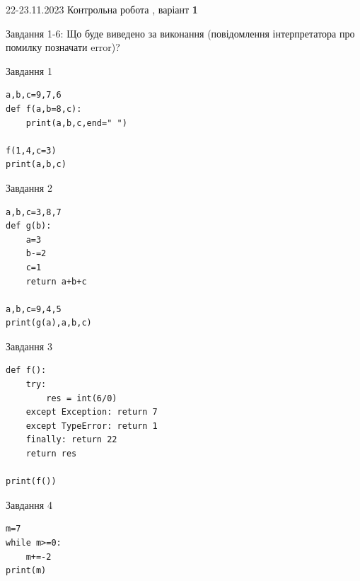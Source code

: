 \documentclass[12pt, ukrainian]{article}
\begin{document}
{{22-23.11.2023 Контрольна робота , варіант  \No \textbf { 1 }\par}}
{

Завдання 1-6: Що буде виведено за виконання (повідомлення інтерпретатора про помилку позначати error)?


\begin{minipage}[t]{9.7cm}                
{\begin{center}Завдання {1}\end{center}}
\begin{verbatim}
a,b,c=9,7,6
def f(a,b=8,c):
    print(a,b,c,end=" ")

f(1,4,c=3)
print(a,b,c)
\end{verbatim}     
\end{minipage}
\vline \hspace{8mm}
\begin{minipage}[t]{8.0cm}                
{\begin{center}Завдання {2}\end{center}}
\begin{verbatim}
a,b,c=3,8,7
def g(b):
    a=3
    b-=2
    c=1
    return a+b+c

a,b,c=9,4,5
print(g(a),a,b,c)
\end{verbatim}     
\end{minipage}

\vspace{15mm}
\begin{minipage}[t]{9.7cm}                
{\begin{center}Завдання {3}\end{center}}
\begin{verbatim}
def f():
    try:
        res = int(6/0)
    except Exception: return 7
    except TypeError: return 1
    finally: return 22
    return res

print(f())
\end{verbatim}     
\end{minipage}
\vline \hspace{8mm}
\begin{minipage}[t]{8.0cm}                
{\begin{center}Завдання {4}\end{center}}
\begin{verbatim}
m=7
while m>=0:
    m+=-2
print(m)
\end{verbatim}     
\end{minipage}

}
\end{document}
